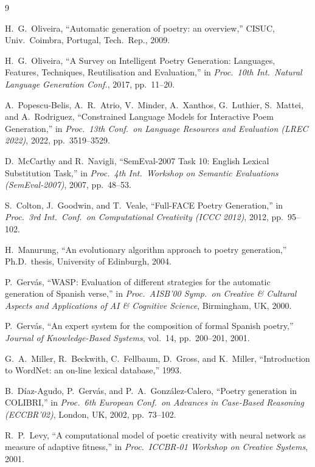 \documentclass[conference]{IEEEtran}
\begin{document}
\begin{thebibliography}{9}

H.~G.~Oliveira, ``Automatic generation of poetry: an overview,'' CISUC, Univ.\ Coimbra, Portugal, Tech.\ Rep., 2009.

H.~G.~Oliveira, ``A Survey on Intelligent Poetry Generation: Languages, Features, Techniques, Reutilisation and Evaluation,'' in \textit{Proc.\ 10th Int.\ Natural Language Generation Conf.}, 2017, pp.~11--20.

A.~Popescu-Belis, A.~R.~Atrio, V.~Minder, A.~Xanthos, G.~Luthier, S.~Mattei, and A.~Rodriguez, ``Constrained Language Models for Interactive Poem Generation,'' in \textit{Proc.\ 13th Conf.\ on Language Resources and Evaluation (LREC 2022)}, 2022, pp.~3519--3529.

D.~McCarthy and R.~Navigli, ``SemEval-2007 Task 10: English Lexical Substitution Task,'' in \textit{Proc.\ 4th Int.\ Workshop on Semantic Evaluations (SemEval-2007)}, 2007, pp.~48--53.

S.~Colton, J.~Goodwin, and T.~Veale, ``Full-FACE Poetry Generation,'' in \textit{Proc.\ 3rd Int.\ Conf.\ on Computational Creativity (ICCC 2012)}, 2012, pp.~95--102.

H.~Manurung, ``An evolutionary algorithm approach to poetry generation,'' Ph.D.\ thesis, University of Edinburgh, 2004.

P.~Gerv\'{a}s, ``WASP: Evaluation of different strategies for the automatic generation of Spanish verse,'' in \textit{Proc.\ AISB'00 Symp.\ on Creative \& Cultural Aspects and Applications of AI \& Cognitive Science}, Birmingham, UK, 2000.

P.~Gerv\'{a}s, ``An expert system for the composition of formal Spanish poetry,'' \textit{Journal of Knowledge-Based Systems}, vol.~14, pp.~200--201, 2001.

G.~A.~Miller, R.~Beckwith, C.~Fellbaum, D.~Gross, and K.~Miller, ``Introduction to WordNet: an on-line lexical database,'' 1993.

B.~D\'{i}az-Agudo, P.~Gerv\'{a}s, and P.~A.~Gonz\'{a}lez-Calero, ``Poetry generation in COLIBRI,'' in \textit{Proc.\ 6th European Conf.\ on Advances in Case-Based Reasoning (ECCBR'02)}, London, UK, 2002, pp.~73--102.

R.~P.~Levy, ``A computational model of poetic creativity with neural network as measure of adaptive fitness,'' in \textit{Proc.\ ICCBR-01 Workshop on Creative Systems}, 2001.

\end{thebibliography}
\end{document}
